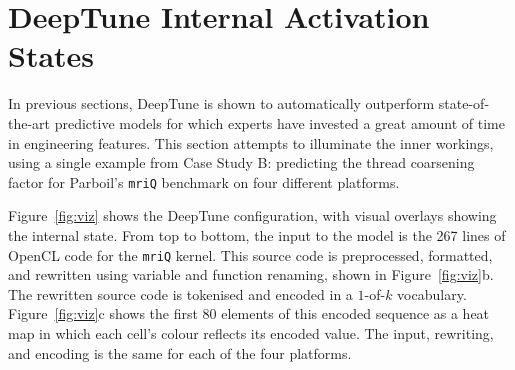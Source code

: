 \section{DeepTune Internal Activation States}
\label{sec:deeptune-internal-states}

In previous sections, DeepTune is shown to automatically outperform state-of-the-art predictive models for which experts have invested a great amount of time in engineering features. This section attempts to illuminate the inner workings, using a single example from Case Study B: predicting the thread coarsening factor for Parboil's \texttt{mriQ} benchmark on four different platforms.

Figure~\ref{fig:viz} shows the DeepTune configuration, with visual overlays showing the internal state. From top to bottom, the input to the model is the 267 lines of OpenCL code for the \texttt{mriQ} kernel. This source code is preprocessed, formatted, and rewritten using variable and function renaming, shown in Figure~\ref{fig:viz}b. The rewritten source code is tokenised and encoded in a $1$-of-$k$ vocabulary. Figure~\ref{fig:viz}c shows the first 80 elements of this encoded sequence as a heat map in which each cell's colour reflects its encoded value. The input, rewriting, and encoding is the same for each of the four platforms.

